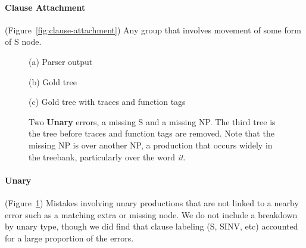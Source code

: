 \paragraph{Clause Attachment} (Figure~\ref{fig:clause-attachment}) 
Any group that involves movement of some form of S node.

\begin{figure}
\begin{center}

\vspace{3mm}
(a) Parser output

\vspace{6mm}


\vspace{3mm}
(b) Gold tree

\vspace{6mm}


\vspace{3mm}
(c) Gold tree with traces and function tags
\end{center}
\derivspace
\caption[Error analysis example: unary.]{ \label{fig:unary} 
	Two \textbf{Unary} errors, a missing S and a missing NP.  The third tree is
	the \ptb tree before traces and function tags are removed.  Note that the
	missing NP is over another NP, a production that occurs widely in the
	treebank, particularly over the word \emph{it}.
}
\derivaftercompress
\end{figure}

\paragraph{Unary} (Figure~\ref{fig:unary}) 
Mistakes involving unary productions that are not linked to a nearby error  such as a matching extra or missing node.
We do not include a breakdown by unary type, though we did find that clause labeling (S, SINV, etc) accounted for a large proportion of the errors.

